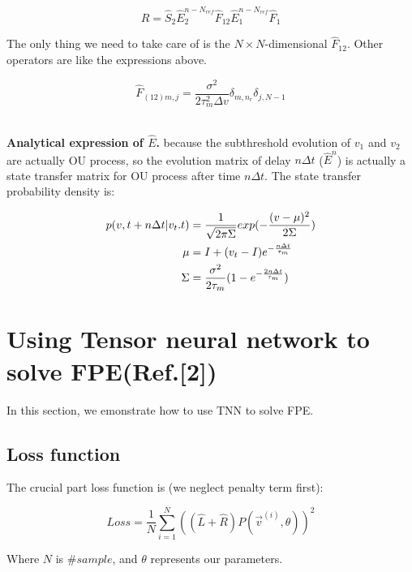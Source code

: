 \documentclass{article}
\begin{document}
	
	\begin{equation}
		\hat{R}=\hat{S}_2\hat{E}_2^{n-N_{ref}}\hat{F}_{12}\hat{E}_1^{n-N_{ref}}\hat{F}_1
	\end{equation}
	
	The only thing we need to take care of is the $N \times N$-dimensional $\hat{F}_{12}$. Other operators are like the expressions above.
	
	\begin{equation}
		\hat{F}_{(12)m,j}=\frac{\sigma^2}{2\tau_m^2\Delta v}\delta_{m,n_r}\delta_{j,N-1}
	\end{equation}
	
	~\\
	
	\textbf{Analytical expression of $\hat{E}$.} because the subthreshold evolution of $v_1$ and $v_2$ are actually OU process, so the evolution matrix of delay $n\Delta t$ ($\hat{E}^n$) is actually a state transfer matrix for OU process after time $n\Delta t$. The state transfer probability density is:
	
	\begin{align}
		p(v,t+n\Delta t|v_t.t)&=\frac{1}{\sqrt{2\pi \Sigma}}exp(-\frac{(v-\mu)^2}{2\Sigma})\notag\\
		\mu&=I+(v_t-I)e^{-\frac{n\Delta t}{\tau_m}}\notag\\
		\Sigma&=\frac{\sigma^2}{2\tau_m}(1-e^{-\frac{2n\Delta t}{\tau_m}})\label{eq: analytical expression of E}
	\end{align}
	
	\section{Using Tensor neural network to solve FPE(Ref.[2])}
	
	In this section, we emonstrate how to use TNN to solve FPE.	
	
	\subsection{Loss function}
		
	The crucial part loss function is (we neglect penalty term first):
	
	\begin{equation}
		Loss=\frac{1}{N}\sum_{i=1}^{N}((\hat{L}+\hat{R})P(\vec{v}^{(i)},\theta))^2
	\end{equation}
	
	Where $N$ is $\#sample$, and $\theta$ represents our parameters.
	
\end{document}
